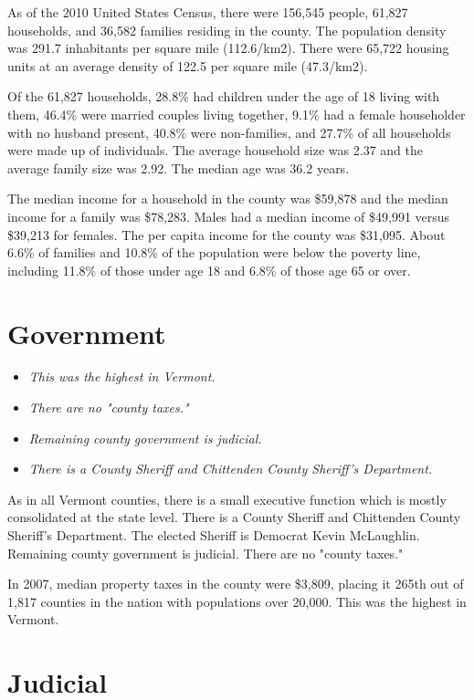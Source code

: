 As of the 2010 United States Census, there were 156,545 people, 61,827
households, and 36,582 families residing in the county. The population
density was 291.7 inhabitants per square mile (112.6/km2). There were
65,722 housing units at an average density of 122.5 per square mile
(47.3/km2).

Of the 61,827 households, 28.8\% had children under the age of 18 living
with them, 46.4\% were married couples living together, 9.1\% had a
female householder with no husband present, 40.8\% were non-families,
and 27.7\% of all households were made up of individuals. The average
household size was 2.37 and the average family size was 2.92. The median
age was 36.2 years.

The median income for a household in the county was \$59,878 and the
median income for a family was \$78,283. Males had a median income of
\$49,991 versus \$39,213 for females. The per capita income for the
county was \$31,095. About 6.6\% of families and 10.8\% of the
population were below the poverty line, including 11.8\% of those under
age 18 and 6.8\% of those age 65 or over.

\section{Government}\label{government}

\begin{itemize}
\item
  \emph{This was the highest in Vermont.}
\item
  \emph{There are no "county taxes."}
\item
  \emph{Remaining county government is judicial.}
\item
  \emph{There is a County Sheriff and Chittenden County Sheriff's
  Department.}
\end{itemize}

As in all Vermont counties, there is a small executive function which is
mostly consolidated at the state level. There is a County Sheriff and
Chittenden County Sheriff's Department. The elected Sheriff is Democrat
Kevin McLaughlin. Remaining county government is judicial. There are no
"county taxes."

In 2007, median property taxes in the county were \$3,809, placing it
265th out of 1,817 counties in the nation with populations over 20,000.
This was the highest in Vermont.

\section{Judicial}\label{judicial}

